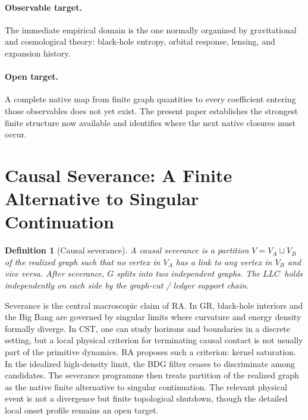 \documentclass[11pt]{article}
\def\mathrm#1{#1}%
\newtheorem{definition}{Definition}
\newcommand{\LLC}{\ensuremath{\mathrm{LLC}}}
\begin{document}
\paragraph{Observable target.} The immediate empirical domain is the one normally organized by gravitational and cosmological theory: black-hole entropy, orbital response, lensing, and expansion history.

\paragraph{Open target.} A complete native map from finite graph quantities to every coefficient entering those observables does not yet exist. The present paper establishes the strongest finite structure now available and identifies where the next native closures must occur.

\section{Causal Severance: A Finite Alternative to Singular Continuation}
\label{sec:severance}

\begin{definition}[Causal severance]
A \emph{causal severance} is a partition $V=V_A\sqcup V_B$ of the realized graph such that no vertex in $V_A$ has a link to any vertex in $V_B$ and vice versa. After severance, $G$ splits into two independent graphs. The \LLC\ holds independently on each side by the graph-cut / ledger support chain.
\end{definition}

Severance is the central macroscopic claim of RA. In GR, black-hole interiors and the Big Bang are governed by singular limits where curvature and energy density formally diverge. In CST, one can study horizons and boundaries in a discrete setting, but a local physical criterion for terminating causal contact is not usually part of the primitive dynamics. RA proposes such a criterion: kernel saturation. In the idealized high-density limit, the BDG filter ceases to discriminate among candidates. The severance programme then treats partition of the realized graph as the native finite alternative to singular continuation. The relevant physical event is not a divergence but finite topological shutdown, though the detailed local onset profile remains an open target.
\end{document}
